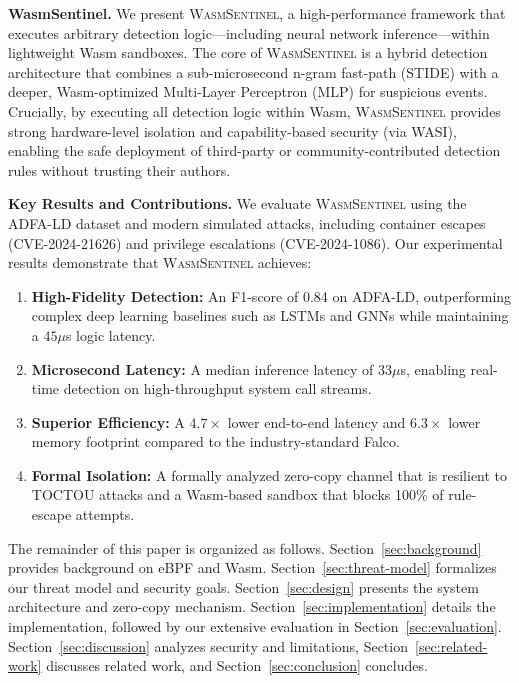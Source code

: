 \textbf{WasmSentinel.}
We present \textsc{WasmSentinel}, a high-performance framework that executes arbitrary detection logic—including neural network inference—within lightweight Wasm sandboxes.
The core of \textsc{WasmSentinel} is a hybrid detection architecture that combines a sub-microsecond n-gram fast-path (STIDE) with a deeper, Wasm-optimized Multi-Layer Perceptron (MLP) for suspicious events.
Crucially, by executing all detection logic within Wasm, \textsc{WasmSentinel} provides strong hardware-level isolation and capability-based security (via WASI), enabling the safe deployment of third-party or community-contributed detection rules without trusting their authors.

\textbf{Key Results and Contributions.}
We evaluate \textsc{WasmSentinel} using the ADFA-LD dataset and modern simulated attacks, including container escapes (CVE-2024-21626) and privilege escalations (CVE-2024-1086).
Our experimental results demonstrate that \textsc{WasmSentinel} achieves:
\begin{enumerate}
    \item \textbf{High-Fidelity Detection:} An F1-score of 0.84 on ADFA-LD, outperforming complex deep learning baselines such as LSTMs and GNNs while maintaining a $45\mu$s logic latency.
    \item \textbf{Microsecond Latency:} A median inference latency of $33\mu$s, enabling real-time detection on high-throughput system call streams.
    \item \textbf{Superior Efficiency:} A $4.7\times$ lower end-to-end latency and $6.3\times$ lower memory footprint compared to the industry-standard Falco.
    \item \textbf{Formal Isolation:} A formally analyzed zero-copy channel that is resilient to TOCTOU attacks and a Wasm-based sandbox that blocks 100\% of rule-escape attempts.
\end{enumerate}

The remainder of this paper is organized as follows.
Section~\ref{sec:background} provides background on eBPF and Wasm.
Section~\ref{sec:threat-model} formalizes our threat model and security goals.
Section~\ref{sec:design} presents the system architecture and zero-copy mechanism.
Section~\ref{sec:implementation} details the implementation, followed by our extensive evaluation in Section~\ref{sec:evaluation}.
Section~\ref{sec:discussion} analyzes security and limitations, Section~\ref{sec:related-work} discusses related work, and Section~\ref{sec:conclusion} concludes.
